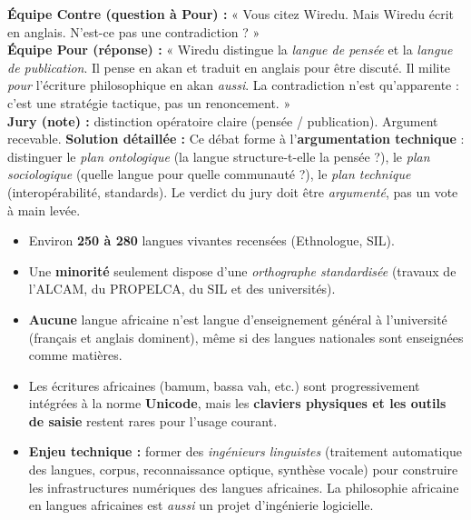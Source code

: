 \documentclass[11pt]{article}
\begin{document}
\begin{exoresolu}
\textbf{Équipe Contre (question à Pour) :} « Vous citez Wiredu. Mais Wiredu écrit en anglais. N'est-ce pas une contradiction ? » \\
\textbf{Équipe Pour (réponse) :} « Wiredu distingue la \emph{langue de pensée} et la \emph{langue de publication}. Il pense en akan et traduit en anglais pour être discuté. Il milite \emph{pour} l'écriture philosophique en akan \emph{aussi}. La contradiction n'est qu'apparente : c'est une stratégie tactique, pas un renoncement. » \\
\textbf{Jury (note) :} distinction opératoire claire (pensée / publication). Argument recevable.
\tcblower
\textbf{Solution détaillée :} Ce débat forme à l'\textbf{argumentation technique} : distinguer le \emph{plan ontologique} (la langue structure-t-elle la pensée ?), le \emph{plan sociologique} (quelle langue pour quelle communauté ?), le \emph{plan technique} (interopérabilité, standards). Le verdict du jury doit être \emph{argumenté}, pas un vote à main levée.
\end{exoresolu}

\begin{exemplebox}
\begin{itemize}
\item Environ \textbf{250 à 280} langues vivantes recensées (Ethnologue, SIL).
\item Une \textbf{minorité} seulement dispose d'une \emph{orthographe standardisée} (travaux de l'ALCAM, du PROPELCA, du SIL et des universités).
\item \textbf{Aucune} langue africaine n'est langue d'enseignement général à l'université (français et anglais dominent), même si des langues nationales sont enseignées comme matières.
\item Les écritures africaines (bamum, bassa vah, etc.) sont progressivement intégrées à la norme \textbf{Unicode}, mais les \textbf{claviers physiques et les outils de saisie} restent rares pour l'usage courant.
\item \textbf{Enjeu technique :} former des \emph{ingénieurs linguistes} (traitement automatique des langues, corpus, reconnaissance optique, synthèse vocale) pour construire les infrastructures numériques des langues africaines. La philosophie africaine en langues africaines est \emph{aussi} un projet d'ingénierie logicielle.
\end{itemize}
\end{exemplebox}
\end{document}
